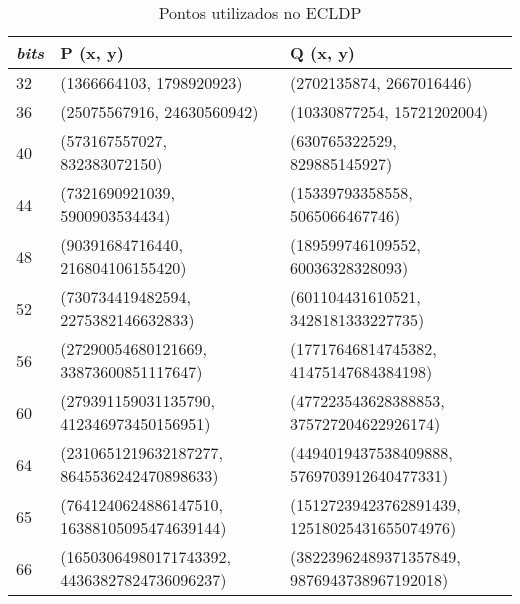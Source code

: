 \begin{anexosenv}
\begin{table}[h]
\centering
\caption{Pontos utilizados no ECLDP}
\label{table:ecldp_points}
\begin{tabular}{|p{1cm}|p{4.5cm}|p{4.5cm}|}
\hline
\multicolumn{1}{|c|}{\textit{bits}} & \textbf{P (x, y)} & \textbf{Q (x, y)} \\ \hline
32 & (1366664103, 1798920923) & (2702135874, 2667016446) \\ \hline
36 & (25075567916, 24630560942) & (10330877254, 15721202004) \\ \hline
40 & (573167557027, 832383072150) & (630765322529, 829885145927) \\ \hline
44 & (7321690921039, 5900903534434) & (15339793358558, 5065066467746) \\ \hline
48 & (90391684716440, 216804106155420) & (189599746109552, 60036328328093) \\ \hline
52 & (730734419482594, 2275382146632833) & (601104431610521, 3428181333227735) \\ \hline
56 & (27290054680121669, 33873600851117647) & (17717646814745382, 41475147684384198) \\ \hline
60 & (279391159031135790, 412346973450156951) & (477223543628388853, 375727204622926174) \\ \hline
64 & (2310651219632187277, 8645536242470898633) & (4494019437538409888, 5769703912640477331) \\ \hline
65 & (7641240624886147510, 16388105095474639144) & (15127239423762891439, 12518025431655074976) \\ \hline
66 & (16503064980171743392, 44363827824736096237) & (38223962489371357849, 9876943738967192018) \\ \hline
\end{tabular}
\end{table}

\end{anexosenv}

